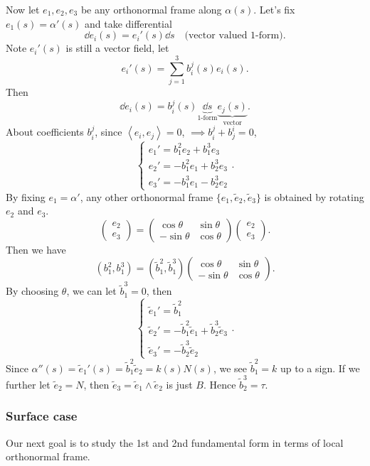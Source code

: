 Now let \(e_1,e_2,e_3\) be any orthonormal frame along \(\alpha(s)\). Let's fix
\(e_1(s)=\alpha'(s)\) and take differential \[
    \dd{e_i}(s)=e_i'(s)\dd{s}\quad \text{(vector valued 1-form)}
.\] Note \(e_i'(s)\) is still a vector field, let \[
    e_i'(s)=\sum_{j=1}^{3}b_i^j(s)e_i(s)
.\] Then \[
    \dd{e_i}(s)=b_i^j(s)\underbrace{\dd{s}}_{\text{1-form}}
    \underbrace{e_j(s)}_{\text{vector}}
.\] About coefficients \(b_i^j\), since \(\left<e_i,e_j\right> =0\), \(\implies b_i^j
+b_j^i=0\), \ie\ \[
    \begin{cases}
        e_1'=b_1^2e_2+b_1^3e_3 \\
        e_2'=-b_1^2e_1+b_2^3e_3 \\
        e_3'=-b_1^3e_1-b_2^3e_2
    \end{cases}
.\] By fixing \(e_1=\alpha'\), any other orthonormal frame \(\{e_1,\tilde{e}_2,
\tilde{e}_3\}\) is obtained by rotating \(e_2\) and \(e_3\). \ie\ \[
    \begin{pmatrix}
        e_2 \\ e_3
    \end{pmatrix}=\begin{pmatrix}
        \cos\theta & \sin\theta \\
        -\sin\theta & \cos\theta
    \end{pmatrix}\begin{pmatrix}
        e_2 \\ e_3
    \end{pmatrix}
.\] Then we have \[
    (b_1^2,b_1^3)=(\tilde{b}_1^2,\tilde{b}_1^3)\begin{pmatrix}
        \cos\theta & \sin\theta \\
        -\sin\theta & \cos\theta
    \end{pmatrix}
.\] By choosing \(\theta\), we can let \(\tilde{b}_1^3=0\), then \[
    \begin{cases}
        \tilde{e}_1'=\tilde{b}_1^2 \\
        \tilde{e}_2'=-\tilde{b}_1^2\tilde{e}_1+\tilde{b}_2^3\tilde{e}_3 \\
        \tilde{e}_3'=-\tilde{b}_2^3\tilde{e}_2
    \end{cases}
.\] Since \(\alpha''(s)=\tilde{e}_1'(s)=\tilde{b}_1^2\tilde{e}_2=k(s)N(s)\),
we see \(\tilde{b}_1^2=k\) up to a sign. If we further let \(\tilde{e}_2=N\),
then \(\tilde{e}_3=\tilde{e}_1\wedge \tilde{e}_2\) is just \(B\). Hence
\(\tilde{b}_2^3=\tau\).

\subsubsection{Surface case}
Our next goal is to study the 1st and 2nd fundamental form
in terms of local orthonormal frame.

